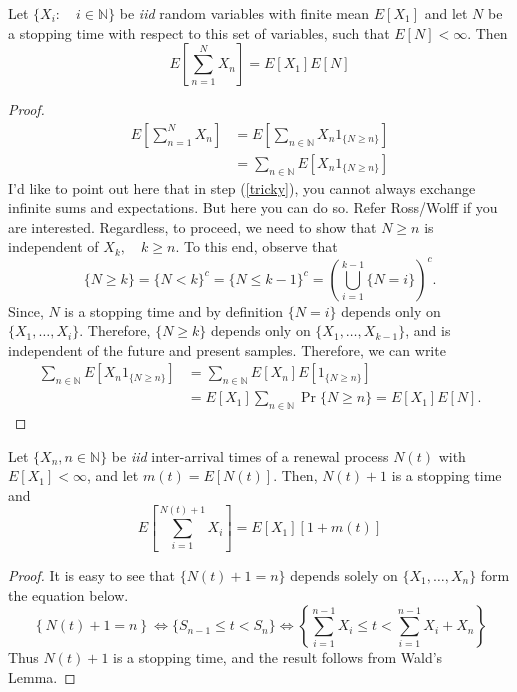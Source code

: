 \documentclass[a4paper,10pt]{article}
\begin{document}
\begin{lem}
Let $\{X_i:\quad i\in \mathbb{N}\}$ be \emph{iid} random variables with finite mean $E[X_1]$ and let $N$ be a stopping time with respect to this set of variables, such that $E[N] < \infty$. Then
\[E\left[\sum_{n=1}^N X_n\right] = E[X_1]E[N]\]
\end{lem}
\begin{proof}
\begin{align}
E\left[\sum_{n=1}^N X_n\right] &= E\left[\sum_{n \in \mathbb{N}} X_n 1_{\{N \geq n\}}\right]  \\
&= \sum_{n \in \mathbb{N}} E\left[X_n 1_{\{N \geq n\}}\right] \label{tricky}
\end{align}
I'd like to point out here that in step (\ref{tricky}), you cannot always exchange infinite sums and expectations. But here you can do so. Refer Ross/Wolff if you are interested. Regardless, to proceed, we need to show that $N \geq n$ is independent of $X_k, \quad k \geq n$. To this end, observe that 
\begin{equation*}
\{N \geq k\} = \{N < k\}^c = \{N \leq k-1\}^c = \left(\bigcup_{i=1}^{k-1} \{N = i\}\right)^c. 
\end{equation*}
Since, $N$ is a stopping time and by definition $\{N=i\}$ depends only on $\{X_1,\ldots, X_i\}$. Therefore, $\{N \geq k\}$ depends only on $\{X_1,\ldots, X_{k-1}\}$, and is independent of the future and present samples. Therefore, we can write
\begin{align*}
\sum_{n \in \mathbb{N}} E\left[X_n 1_{\{N \geq n\}}\right] &= \sum_{n \in \mathbb{N}} E\left[X_n\right]E\left[ 1_{\{N \geq n\}}\right] \\
&= E\left[X_1\right] \sum_{n \in \mathbb{N}} \Pr\{N \geq n\} = E[X_1]E[N].
\end{align*} 
\end{proof}

\begin{prop} \label{prop:WaldRenewal}
Let $\{X_n, n \in \mathbb{N}\}$ be \emph{iid} inter-arrival times of a renewal process $N(t)$ with $E[X_1] < \infty$, and let $m(t) = E[N(t)]$. Then, $N(t)+1$ is a stopping time and 
 \begin{equation*}
E\left[\sum_{i=1}^{N(t)+1}X_i\right] = E[X_1][1+m(t)]
\end{equation*}
\end{prop}
\begin{proof} It is easy to see that $\{N(t)+1=n\}$ depends solely on $\{X_1,\ldots,X_n\}$ form the equation below.
\begin{equation*}
\left\{N(t) + 1 = n \right\} \iff \{S_{n-1} \leq t < S_n\} \iff \left\{\sum_{i=1}^{n-1} X_i \leq t < \sum_{i=1}^{n-1} X_i + X_n\right\}
\end{equation*}
Thus $N(t)+1$ is a stopping time, and the result follows from Wald's Lemma.
\end{proof}
\end{document}
